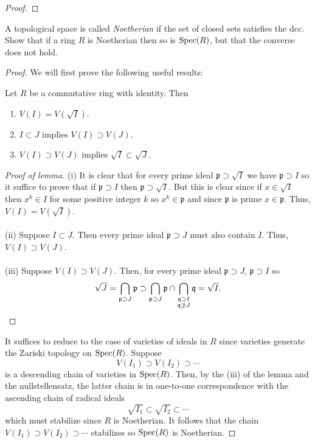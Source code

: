 \begin{proof}
\end{proof}
\newpage
\begin{problem}
A topological space is called \emph{Noetherian} if the set of
closed sets satisfies the dcc. Show that if a ring $R$ is
Noetherian then so is $\operatorname{Spec}(R)$, but that the converse does not
hold.
\end{problem}
\begin{proof}
We will first prove the following useful results:
\begin{lemma*}
Let $R$ be a commutative ring with identity. Then
\begin{enumerate}[noitemsep,label=(\roman*)]
\item $V(I)=V(\sqrt{I})$.
\item $I\subset J$ implies $V(I)\supset V(J)$.
\item $V(I)\supset V(J)$ implies $\sqrt{I}\subset\sqrt{J}$.
\end{enumerate}
\end{lemma*}
\begin{proof}[Proof of lemma]
\renewcommand\qedsymbol{$\clubsuit$}
(i) It is clear that for every prime ideal
$\mathfrak{p}\supset\sqrt{I}$ we have $\mathfrak{p}\supset I$ so
it suffice to prove that if $\mathfrak{p}\supset I$ then
$\mathfrak{p}\supset\sqrt{I}$. But this is clear since if
$x\in\sqrt{I}$ then $x^k\in I$ for some positive integer $k$ so
$x^k\in\mathfrak{p}$ and since $\mathfrak{p}$ is prime
$x\in\mathfrak{p}$. Thus, $V(I)=V(\sqrt{I})$.
\\\\
(ii) Suppose $I\subset J$. Then every prime ideal
$\mathfrak{p}\supset J$ must also contain $I$. Thus, $V(I)\supset
V(J)$.
\\\\
(iii) Suppose $V(I)\supset V(J)$. Then, for every prime ideal
$\mathfrak{p}\supset J$, $\mathfrak{p}\supset I$ so
\[
\sqrt{J}=\bigcap_{\mathfrak{p}\supset J}\mathfrak{p}\supset
\bigcap_{\mathfrak{p}\supset
    J}\mathfrak{p}\cap\bigcap_{\substack{\mathfrak{q}\supset
    I\\\mathfrak{q}\not\supset J}}\mathfrak{q}=\sqrt{I}.\qedhere
\]
\end{proof}
It suffices to reduce to the case of varieties of ideals in
$R$ since varieties generate the Zariski topology on
$\operatorname{Spec}(R)$. Suppose
\[
V(I_1)\supset V(I_2)\supset\cdots
\]
is a descending chain of varieties in $\operatorname{Spec}(R)$. Then, by the (iii)
of the lemma and the nullstellensatz, the latter chain is in
one-to-one correspondence with the ascending chain of radical ideals
\[
\sqrt{I_1}\subset\sqrt{I_2}\subset\cdots
\]
which must stabilize since $R$ is Noetherian. It follows that the
chain $V(I_1)\supset V(I_2)\supset\cdots$ stabilizes so $\operatorname{Spec}(R)$ is
Noetherian.
\end{proof}
